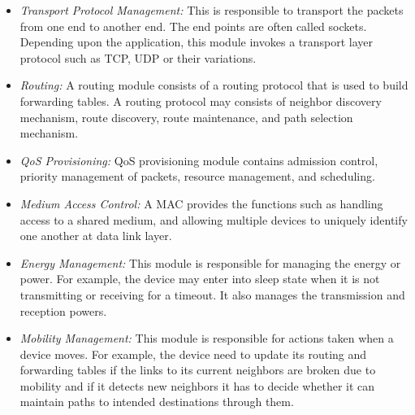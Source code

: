 \documentclass[10pt,times,epsfig,psfig,twocolumn,algorithm,algorithmic]{IEEEtran}
\begin{document}
\begin{itemize}



\item {\em Transport Protocol Management:} This is responsible to transport the packets from one end to another end. The end points are often called sockets. Depending upon the application, this module invokes a transport layer protocol such as TCP, UDP or their variations.

\item {\em Routing:} A routing module consists of a routing protocol that is used to build forwarding tables. A routing protocol may consists of neighbor discovery mechanism, route discovery, route maintenance, and path selection mechanism.

\item {\em QoS Provisioning:} QoS provisioning module contains admission control, priority management of packets, resource management, and scheduling.

\item {\em Medium Access Control:} A MAC provides the functions such as handling access to a shared medium, and allowing multiple devices to uniquely identify one another at data link layer.

\item {\em Energy Management:} This module is responsible for managing the energy or power. For example, the device may enter into sleep state when it is not transmitting or receiving for a timeout. It also manages the transmission and reception powers.

\item {\em Mobility Management:} This module is responsible for actions taken when a device moves. For example, the device need to update its routing and forwarding tables if the links to its current neighbors are broken due to mobility and if it detects new neighbors it has to decide whether it can maintain paths to intended destinations through them.  







\end{itemize} 
\end{document}
